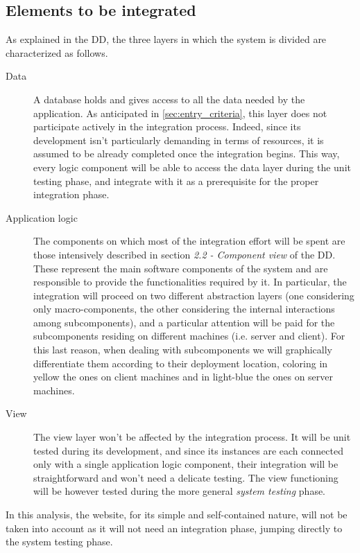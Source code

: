 \subsection{Elements to be integrated}
\label{sec:elements_to_be_integrated}
	As explained in the DD, the three layers in which the system is divided are characterized as follows.
	\begin{description}
		\item[Data] A database holds and gives access to all the data needed by the application. As anticipated in \autoref{sec:entry_criteria}, this layer does not participate actively in the integration process. Indeed, since its development isn't particularly demanding in terms of resources, it is assumed to be already completed once the integration begins. This way, every logic component will be able to access the data layer during the unit testing phase, and integrate with it as a prerequisite for the proper integration phase.
		\item[Application logic] The components on which most of the integration effort will be spent are those intensively described in section \textit{2.2 - Component view} of the DD. These represent the main software components of the system and are responsible to provide the functionalities required by it. In particular, the integration will proceed on two different abstraction layers (one considering only macro-components, the other considering the internal interactions among subcomponents), and a particular attention will be paid for the subcomponents residing on different machines (i.e. server and client). For this last reason, when dealing with subcomponents we will graphically differentiate them according to their deployment location, coloring in yellow the ones on client machines and in light-blue the ones on server machines.
		\item[View] The view layer won't be affected by the integration process. It will be unit tested during its development, and since its instances are each connected only with a single application logic component, their integration will be straightforward and won't need a delicate testing. The view functioning will be however tested during the more general \textit{system testing} phase. %
	\end{description}
	In this analysis, the website, for its simple and self-contained nature, will not be taken into account as it will not need an integration phase, jumping directly to the system testing phase.	\newline

